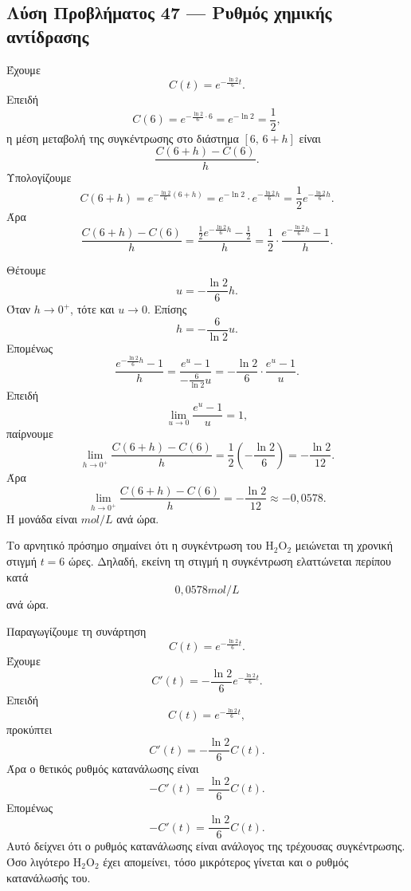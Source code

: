 \subsection*{Λύση Προβλήματος 47 --- Ρυθμός χημικής αντίδρασης}

\begin{alist}
  \item Έχουμε
        \[
          C(t)=e^{-\frac{\ln2}{6}t}.
        \]
        Επειδή
        \[
          C(6)=e^{-\frac{\ln2}{6}\cdot6}=e^{-\ln2}=\frac12,
        \]
        η μέση μεταβολή της συγκέντρωσης στο διάστημα $[6,\,6+h]$ είναι
        \[
          \frac{C(6+h)-C(6)}{h}.
        \]
        Υπολογίζουμε
        \[
          C(6+h)
          =
          e^{-\frac{\ln2}{6}(6+h)}
          =
          e^{-\ln2}\cdot e^{-\frac{\ln2}{6}h}
          =
          \frac12 e^{-\frac{\ln2}{6}h}.
        \]
        Άρα
        \[
          \frac{C(6+h)-C(6)}{h}
          =
          \frac{\frac12 e^{-\frac{\ln2}{6}h}-\frac12}{h}
          =
          \frac12\cdot
          \frac{e^{-\frac{\ln2}{6}h}-1}{h}.
        \]

  \item Θέτουμε
        \[
          u=-\frac{\ln2}{6}h.
        \]
        Όταν $h\to0^+$, τότε και $u\to0$. Επίσης
        \[
          h=-\frac{6}{\ln2}u.
        \]
        Επομένως
        \[
          \frac{e^{-\frac{\ln2}{6}h}-1}{h}
          =
          \frac{e^u-1}{-\frac{6}{\ln2}u}
          =
          -\frac{\ln2}{6}\cdot\frac{e^u-1}{u}.
        \]
        Επειδή
        \[
          \lim_{u\to0}\frac{e^u-1}{u}=1,
        \]
        παίρνουμε
        \[
          \lim_{h\to0^+}
          \frac{C(6+h)-C(6)}{h}
          =
          \frac12\left(-\frac{\ln2}{6}\right)
          =
          -\frac{\ln2}{12}.
        \]
        Άρα
        \[
          {
          \lim_{h\to0^+}
          \frac{C(6+h)-C(6)}{h}
          =
          -\frac{\ln2}{12}
          \approx
          -0{,}0578
          }.
        \]
        Η μονάδα είναι \(\si{mol/L}\) ανά ώρα.

        Το αρνητικό πρόσημο σημαίνει ότι η συγκέντρωση του
        \(\mathrm{H_2O_2}\) μειώνεται τη χρονική στιγμή $t=6$ ώρες.
        Δηλαδή, εκείνη τη στιγμή η συγκέντρωση ελαττώνεται περίπου κατά
        \[
          0{,}0578\si{mol/L}
        \]
        ανά ώρα.

  \item Παραγωγίζουμε τη συνάρτηση
        \[
          C(t)=e^{-\frac{\ln2}{6}t}.
        \]
        Έχουμε
        \[
          C'(t)
          =
          -\frac{\ln2}{6}e^{-\frac{\ln2}{6}t}.
        \]
        Επειδή
        \[
          C(t)=e^{-\frac{\ln2}{6}t},
        \]
        προκύπτει
        \[
          C'(t)=-\frac{\ln2}{6}C(t).
        \]
        Άρα ο θετικός ρυθμός κατανάλωσης είναι
        \[
          -C'(t)=\frac{\ln2}{6}C(t).
        \]
        Επομένως
        \[
          {
          -C'(t)=\frac{\ln2}{6}C(t)
          }.
        \]
        Αυτό δείχνει ότι ο ρυθμός κατανάλωσης είναι ανάλογος της
        τρέχουσας συγκέντρωσης. Όσο λιγότερο \(\mathrm{H_2O_2}\) έχει
        απομείνει, τόσο μικρότερος γίνεται και ο ρυθμός κατανάλωσής του.
\end{alist}
